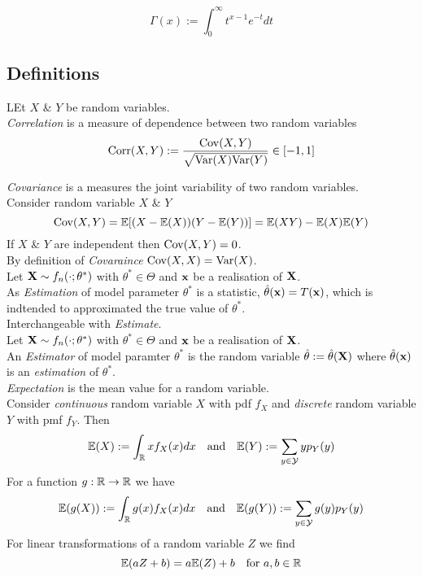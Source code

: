 \documentclass[11pt,a4paper]{article}
\begin{document}
$$\Gamma(x):=\int_0^\infty t^{x-1}e^{-t}dt$$

\subsection{Definitions}

LEt $X$ \& $Y$ be random variables.\\
\textit{Correlation} is a measure of dependence between two random variables
$$\text{Corr}(X,Y):=\frac{\mathrm{Cov}(X,Y)}{\sqrt{\mathrm{Var}(X)\mathrm{Var}(Y)}}\in[-1,1]$$

\textit{Covariance} is a measures the joint variability of two random variables.\\
Consider random variable $X$ \& $Y$
$$\mathrm{Cov}(X,Y)=\mathbb{E}[(X-\mathbb{E}(X))(Y-\mathbb{E}(Y))]=\mathbb{E}(XY)-\mathbb{E}(X)\mathbb{E}(Y)$$
If $X$ \& $Y$ are independent then $\mathrm{Cov}(X,Y)=0$.\\
By definition of \textit{Covaraince} $\mathrm{Cov}(X,X)=\mathrm{Var}(X)$.\\

Let $\textbf{X}\sim f_n(\cdot;\theta^*)$ with $\theta^*\in\Theta$ and $\textbf{x}$ be a realisation of $\textbf{X}$.\\
As \textit{Estimation} of model parameter $\theta^*$ is a statistic, $\hat\theta(\textbf{x})=T(\textbf{x})$, which is indtended to approximated the true value of $\theta^*$.\\
\nb Interchangeable with \textit{Estimate}.\\

Let $\textbf{X}\sim f_n(\cdot;\theta^*)$ with $\theta^*\in\Theta$ and $\textbf{x}$ be a realisation of $\textbf{X}$.\\
An \textit{Estimator} of model paramter $\theta^*$ is the random variable $\hat\theta:=\hat\theta(\textbf{X})$ where $\hat\theta(\textbf{x})$ is an \textit{estimation} of $\theta^*$.\\

\textit{Expectation} is the mean value for a random variable.\\
Consider \textit{continuous} random variable $X$ with pdf $f_X$ and \textit{discrete} random variable $Y$ with pmf $f_Y$. Then
$$\mathbb{E}(X):=\int_{\mathbb{R}} xf_X(x)dx\quad\text{and}\quad\mathbb{E}(Y):=\sum_{y\in\mathcal{Y}}yp_Y(y)$$
For a function $g:\mathbb{R}\to\mathbb{R}$ we have
$$\mathbb{E}(g(X)):=\int_{\mathbb{R}} g(x)f_X(x)dx\quad\text{and}\quad\mathbb{E}(g(Y)):=\sum_{y\in\mathcal{Y}}g(y)p_Y(y)$$
For linear transformations of a random variable $Z$ we find
$$\mathbb{E}(aZ+b)=a\mathbb{E}(Z)+b\quad\text{for }a,b\in\mathbb{R}$$
\end{document}
